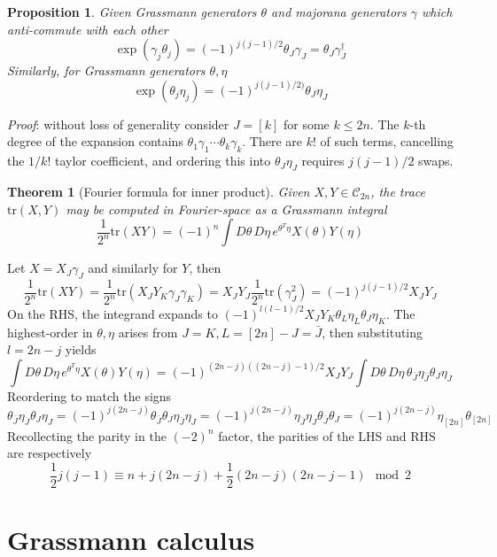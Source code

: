 \documentclass[
]{book}
\newtheorem{theorem}{Theorem}[chapter]
\newtheorem{proposition}{Proposition}[chapter]
\theoremstyle{definition}
\theoremstyle{definition}
\theoremstyle{definition}
\theoremstyle{definition}
\theoremstyle{remark}
\begin{document}
\begin{proposition}
Given Grassmann generators \(\theta\) and majorana generators \(\gamma\) which
anti-commute with each other
\[ 
    \exp(\gamma_j\theta_j) = (-1)^{j(j-1)/2} \theta_J \gamma_J 
    = \theta_J \gamma_J^\dagger
\]
Similarly, for Grassmann generators \(\theta, \eta\)
\[ 
    \exp(\theta_j\eta_j) = (-1)^{j(j-1)/2)}\theta_J \eta_J 
\]
\end{proposition}

\emph{Proof}: without loss of generality consider \(J=[k]\) for some \(k\leq 2n\).
The \(k\)-th degree of the expansion
contains \(\theta_1\gamma_1\cdots\theta_k\gamma_k\).
There are \(k!\) of such terms, cancelling the \(1/k!\) taylor coefficient, and
ordering this into \(\theta_J\eta_J\) requires \(j(j-1)/2\) swaps.

\begin{theorem}[Fourier formula for inner product]
\protect\hypertarget{thm:tracialOverlap}{}\label{thm:tracialOverlap}Given \(X, Y\in \mathcal C_{2n}\), the trace \(\mathrm{tr}(X, Y)\) may be computed
in Fourier-space as a Grassmann integral
\[ 
    \dfrac 1 {2^n}\mathrm{tr}(XY) 
    = (-1)^n \int D\theta\, D\eta \, e^{\theta^T\eta} X(\theta) Y(\eta)
\]
\end{theorem}

Let \(X=X_J \gamma_J\) and similarly for \(Y\), then
\[ 
    \dfrac 1 {2^n}\mathrm{tr}(XY) = \dfrac 1 {2^n}\mathrm{tr}(X_JY_K \gamma_J\gamma_K)
    = X_J Y_J \dfrac 1 {2^n}\mathrm{tr}(\gamma_J^2) = (-1)^{j(j-1)/2} X_JY_J
\]
On the RHS, the integrand expands to
\((-1)^{l(l-1)/2}X_J Y_K \theta_L\eta_L\theta_J\eta_K\).
The highest-order in \(\theta, \eta\) arises from \(J=K, L=[2n]-J=\bar J\), then
substituting \(l=2n-j\) yields
\[ 
    \int D\theta\, D\eta \, e^{\theta^T\eta} X(\theta) Y(\eta) 
    = (-1)^{(2n-j)((2n-j)-1)/2}X_J Y_J\int D\theta\, D\eta\,  \theta_{\bar J}\eta_{\bar J} \theta_J \eta_J 
\]
Reordering to match the signs
\[ 
    \theta_{\bar J}\eta_{\bar J}\theta_J \eta_J 
    = (-1)^{j(2n-j)}\theta_{\bar J}\theta_J \eta_{\bar J}\eta_J
    = (-1)^{j(2n-j)}\eta_{\bar J}\eta_J\theta_{\bar J}\theta_J 
    = (-1)^{j(2n-j)}\eta_{[2n]}\theta_{[2n]}
\]
Recollecting the parity in the \((-2)^n\) factor, the parities of the LHS
and RHS are respectively
\[ 
    \dfrac 1 2 j(j-1) \equiv n + j(2n-j) + \dfrac 1 2 (2n-j)(2n-j-1) \mod 2
\]

\section{Grassmann calculus}\label{grassmann-calculus}
\end{document}
